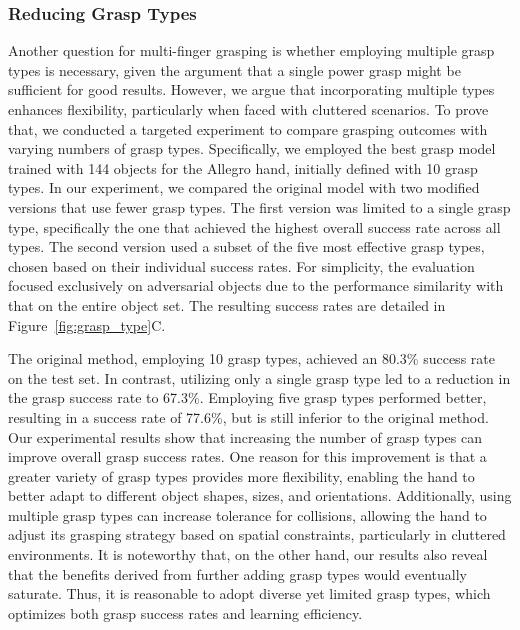 \subsubsection*{Reducing Grasp Types}
Another question for multi-finger grasping is whether employing multiple grasp types is necessary, given the argument that a single power grasp might be sufficient for good results. However, we argue that incorporating multiple types enhances flexibility, particularly when faced with cluttered scenarios. To prove that, we conducted a targeted experiment to compare grasping outcomes with varying numbers of grasp types. Specifically, we employed the best grasp model trained with 144 objects for the Allegro hand, initially defined with 10 grasp types. In our experiment, we compared the original model with two modified versions that use fewer grasp types. The first version was limited to a single grasp type, specifically the one that achieved the highest overall success rate across all types. The second version used a subset of the five most effective grasp types, chosen based on their individual success rates. For simplicity, the evaluation focused exclusively on adversarial objects due to the performance similarity with that on the entire object set. The resulting success rates are detailed in Figure~\ref{fig:grasp_type}C.

The original method, employing 10 grasp types, achieved an 80.3\% success rate on the test set. In contrast, utilizing only a single grasp type led to a reduction in the grasp success rate to 67.3\%. Employing five grasp types performed better, resulting in a success rate of 77.6\%, but is still inferior to the original method. Our experimental results show that increasing the number of grasp types can improve overall grasp success rates. One reason for this improvement is that a greater variety of grasp types provides more flexibility, enabling the hand to better adapt to different object shapes, sizes, and orientations. Additionally, using multiple grasp types can increase tolerance for collisions, allowing the hand to adjust its grasping strategy based on spatial constraints, particularly in cluttered environments. It is noteworthy that, on the other hand, our results also reveal that the benefits derived from further adding grasp types would eventually saturate. Thus, it is reasonable to adopt diverse yet limited grasp types, which optimizes both grasp success rates and learning efficiency.
